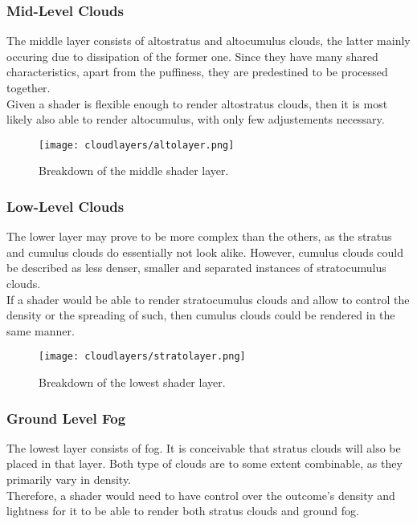 \subsubsection{Mid-Level Clouds}
\label{section:impl:layers:mid}
The middle layer consists of altostratus and altocumulus clouds, the latter mainly occuring due to dissipation of the former one.
Since they have many shared characteristics, apart from the puffiness, they are predestined to be processed together.
\\
Given a \gls{shader} is flexible enough to render altostratus clouds, then it is most likely also able to render altocumulus, with only few adjustements necessary.

\begin{figure}[H]
    \texttt{[image: cloudlayers/altolayer.png]}
    \caption{Breakdown of the middle shader layer.}
    \label{img:cloudlayer:alto}
\end{figure}

\pagebreak

\subsubsection{Low-Level Clouds}
\label{section:impl:layers:low}
The lower layer may prove to be more complex than the others, as the stratus and cumulus clouds do essentially not look alike.
However, cumulus clouds could be described as less denser, smaller and separated instances of stratocumulus clouds.
\\
If a \gls{shader} would be able to render stratocumulus clouds and allow to control the density or the spreading of such, then cumulus clouds could be rendered in the same manner.

\begin{figure}[H]
    \texttt{[image: cloudlayers/stratolayer.png]}
    \caption{Breakdown of the lowest shader layer.}
    \label{img:cloudlayer:alto}
\end{figure}


\subsubsection{Ground Level Fog}
\label{section:impl:layers:fog}
The lowest layer consists of fog. It is conceivable that stratus clouds will also be placed in that layer.
Both type of clouds are to some extent combinable, as they primarily vary in density.
\\
Therefore, a \gls{shader} would need to have control over the outcome's density and lightness for it to be able to render both stratus clouds and ground fog.

